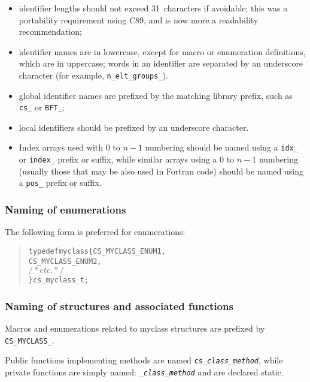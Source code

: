 \begin{itemize}

\item identifier lengths should not exceed 31~characters if avoidable;
  this was a portability requirement using C89, and is now more a
  readability recommendation;

\item identifier names are in lowercase, except for macro or enumeration
  definitions, which are in uppercase; words in an identifier are
  separated by an underscore character (for example,
  \verb=n_elt_groups_=).

\item global identifier names are prefixed by the matching library prefix,
  such as \verb=cs_= or \verb=BFT_=;

\item local identifiers should be prefixed by an underscore character.

\item Index arrays used with $0$ to $n-1$ numbering should be named
  using a \verb=idx_= or \verb=index_= prefix or suffix, while
  similar arrays using a $0$ to $n-1$ numbering (usually those that may be
  also used in Fortran code) should be named using a \verb=pos_=
  prefix or suffix.

\end{itemize}

\subsubsection{Naming of enumerations}

The following form is preferred for enumerations:

\begin{quote}
\begin{alltt}
typedef myclass \{ CS_MYCLASS_ENUM1,
                   CS_MYCLASS_ENUM2,
                \( /* etc. */ \)
                \} cs_myclass_t;
\end{alltt}
\end{quote}

\subsubsection{Naming of structures and associated functions}

Macros and enumerations related to myclass structures
are prefixed by \verb=CS_MYCLASS_=.

Public functions implementing methods are named
 \texttt{cs\_\textit{class\_method}}, while private functions are simply named:
\texttt{\_\textit{class\_method}} and are declared static.

